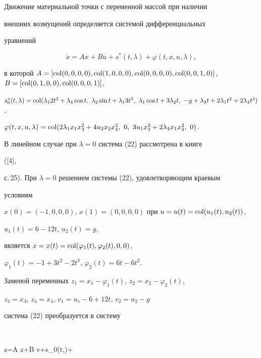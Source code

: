 \begin{examnonum} 


Движение материальной точки с переменной массой при наличии 


внешних возмущений определяется системой дифференциальных 


уравнений 


\begin{equation} 


\Dot x=A x+B u+s^*(t,\lambda)+\varphi(t,x,u,\lambda), 


\end{equation} 


в которой $A=[\col(0,0,0,0), \col(1,0,0,0),\col(0,0,0,0), 


\col(0,0,1,0)]$, $B=[\col(0,1,0,0), \col(0,0,0,1)]$, 


$s^*_0(t,\lambda)=\col(\lambda_1 2t^2+\lambda_4\cos t,\ \lambda_2\sin 


t+\lambda_1 3t^3,\ \lambda_1\cos t+3\lambda_2t,\ 


-g+\lambda_3t+2\lambda_1t^2+2\lambda_4t^3)$, 


$\varphi(t,x,u,\lambda)=\col(2\lambda_1x_1x^2_3+ 4u_2x_2x^2_4,\ 0,\ 


3u_1x^3_3+2\lambda_4x_1x^2_4,\ 0)$. 


 


В линейном случае при $\lambda=0$ система (22) рассмотрена в книге 


([4], 


с.\,25). При $\lambda=0$ решением системы (22), удовлетворяющим краевым 


условиям 


$x(0)=(-1,0,0,0)$, $x(1)=(0,0,0,0)$ при $u=u(t)=\operatorname{col}(u_1(t),u_2(t))$, 


$u_1(t)=6-12t$, $u_2(t)=g$, 


является $x=x(t)=\operatorname{col}(\varphi_1(t),\varphi_2(t),0,0)$, 


$\varphi_1(t)=-1+3t^2-2t^3$, $\varphi_2(t)=6t-6t^2$. 


 


Заменой переменных $z_1=x_1-\varphi_1(t)$, $z_2=x_2-\varphi_2(t)$, 


$z_3=x_3$, $z_4=x_4$, $v_1=u_1-6+12t$, $v_2=u_2-g$ 


система (22) преобразуется в систему 


$$ 


\Dot z=A z+B v+s_0(t,\lambda)+ 



\end{examnonum}

